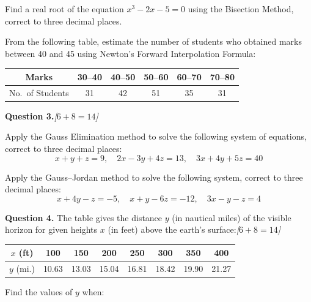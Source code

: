 \documentclass[11pt,a4paper]{article}
\newcommand{\pts}[1]{\hfill   \textit{[#1]}}
\begin{document}
\begin{parts}
  \item Find a real root of the equation $x^3 - 2x - 5 = 0$ using the Bisection Method, correct to three decimal places.
  \item From the following table, estimate the number of students who obtained marks between 40 and 45 using Newton's Forward Interpolation Formula:
  
\begin{center}
  
\begin{tabular}{|c|c|c|c|c|c|}
  \hline
  Marks & 30--40 & 40--50 & 50--60 & 60--70 & 70--80 \\
  \hline
  No.\ of Students & 31 & 42 & 51 & 35 & 31 \\
  \hline
  \end{tabular}
  \end{center}
\end{parts}

\bigskip




\noindent   \textbf{Question 3.}\pts{$6+8=14$}

\begin{parts}
  \item Apply the Gauss Elimination method to solve the following system of equations, correct to three decimal places:
  \[
    x + y + z = 9, \quad 2x - 3y + 4z = 13, \quad 3x + 4y + 5z = 40
  \]
  \item Apply the Gauss--Jordan method to solve the following system, correct to three decimal places:
  \[
    x + 4y - z = -5, \quad x + y - 6z = -12, \quad 3x - y - z = 4
  \]
\end{parts}

\bigskip




\noindent   \textbf{Question 4.} The table gives the distance $y$ (in nautical miles) of the visible horizon for given heights $x$ (in feet) above the earth's surface:\pts{$6+8=14$}

\begin{center}

\begin{tabular}{|c|c|c|c|c|c|c|c|}
\hline
$x$ (ft)  & 100   & 150   & 200   & 250   & 300   & 350   & 400   \\
\hline
$y$ (mi.) & 10.63 & 13.03 & 15.04 & 16.81 & 18.42 & 19.90 & 21.27 \\
\hline
\end{tabular}
\end{center}
Find the values of $y$ when:
\end{document}
